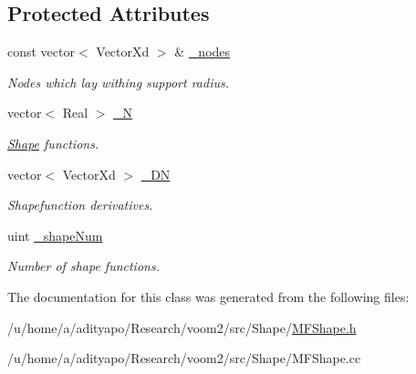 \subsection*{Protected Attributes}
\begin{DoxyCompactItemize}
\item 
\hypertarget{classvoom_1_1_m_f_shape_a4619a9546595c6b145cf392af4c3db84}{
const vector$<$ VectorXd $>$ \& \hyperlink{classvoom_1_1_m_f_shape_a4619a9546595c6b145cf392af4c3db84}{\_\-nodes}}
\label{classvoom_1_1_m_f_shape_a4619a9546595c6b145cf392af4c3db84}

\begin{DoxyCompactList}\small\item\em Nodes which lay withing support radius. \item\end{DoxyCompactList}\item 
\hypertarget{classvoom_1_1_m_f_shape_a01e0c0a865df4a28dba1cb6090b378d1}{
vector$<$ Real $>$ \hyperlink{classvoom_1_1_m_f_shape_a01e0c0a865df4a28dba1cb6090b378d1}{\_\-N}}
\label{classvoom_1_1_m_f_shape_a01e0c0a865df4a28dba1cb6090b378d1}

\begin{DoxyCompactList}\small\item\em \hyperlink{classvoom_1_1_shape}{Shape} functions. \item\end{DoxyCompactList}\item 
\hypertarget{classvoom_1_1_m_f_shape_a32c93d0524d948aea780f47f04e52031}{
vector$<$ VectorXd $>$ \hyperlink{classvoom_1_1_m_f_shape_a32c93d0524d948aea780f47f04e52031}{\_\-DN}}
\label{classvoom_1_1_m_f_shape_a32c93d0524d948aea780f47f04e52031}

\begin{DoxyCompactList}\small\item\em Shapefunction derivatives. \item\end{DoxyCompactList}\item 
\hypertarget{classvoom_1_1_m_f_shape_a1ac2531795f772861be14e5c63365ab5}{
uint \hyperlink{classvoom_1_1_m_f_shape_a1ac2531795f772861be14e5c63365ab5}{\_\-shapeNum}}
\label{classvoom_1_1_m_f_shape_a1ac2531795f772861be14e5c63365ab5}

\begin{DoxyCompactList}\small\item\em Number of shape functions. \item\end{DoxyCompactList}\end{DoxyCompactItemize}


The documentation for this class was generated from the following files:\begin{DoxyCompactItemize}
\item 
/u/home/a/adityapo/Research/voom2/src/Shape/\hyperlink{_m_f_shape_8h}{MFShape.h}\item 
/u/home/a/adityapo/Research/voom2/src/Shape/MFShape.cc\end{DoxyCompactItemize}
